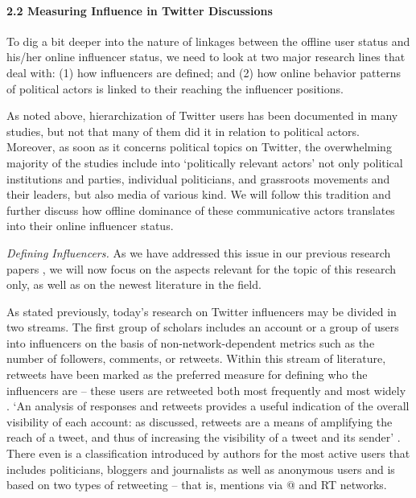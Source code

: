 \paragraph{2.2 Measuring Influence in Twitter Discussions} 
To dig a bit deeper into the nature of linkages between the offline user status and his/her online influencer status, we need to look at two major research lines that deal with: (1) how influencers are defined; and (2) how online behavior patterns of political actors is linked to their reaching the influencer positions.

As noted above, hierarchization of Twitter users has been documented in many studies, but not that many of them did it in relation to political actors. Moreover, as soon as it concerns political topics on Twitter, the overwhelming majority of the studies include into ‘politically relevant actors’ not only political institutions and parties, individual politicians, and grassroots movements and their leaders, but also media of various kind. We will follow this tradition and further discuss how offline dominance of these communicative actors translates into their online influencer status.

\textit{Defining Influencers.} As we have addressed this issue in our previous research papers \cite{BodrunovaLitvinenkoNigmatullina,BodrunovaLitvinenkoBlekanov2016}, we will now focus on the aspects relevant for the topic of this research only, as well as on the newest literature in the field.

As stated previously, today’s research on Twitter influencers may be divided in two streams. The first group of scholars includes an account or a group of users into influencers on the basis of non-network-dependent metrics such as the number of followers, comments, or retweets. Within this stream of literature, retweets have been marked as the preferred measure for defining who the influencers are -- these users are retweeted both most frequently and most widely \cite{FrebergGrahamMcGaughey,Aquino,SajuriaVanHeerdeHudsonHudson}. ‘An analysis of responses and retweets provides a useful indication of the overall visibility of each account: as discussed, retweets are a means of amplifying the reach of a tweet, and thus of increasing the visibility of a tweet and its sender’ \cite{BrunsBurgees2012,KwakLeePark,BoydGolderLotan,ChaHaddadiBenevenuto}. There even is a classification introduced by authors \cite{LarssonMoe} for the most active users that includes politicians, bloggers and journalists as well as anonymous users and is based on two types of retweeting -- that is, mentions via @ and RT networks.

